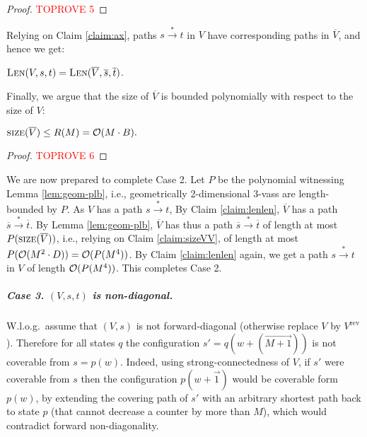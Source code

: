 \documentclass[a4paper, UKenglish, cleveref, autoref, thm-restate]{lipics-v2021}
\newcommand{\trans}[1]{\stackrel{#1}{\longrightarrow}}
\newcommand{\tran}{\trans{*}}
\newcommand{\size}{\textsc{size}}
\renewcommand{\vec}[1]{\overrightarrow{#1}}
\newcommand{\lb}{length-bounded\xspace}
\newcommand{\Len}[3]{\textsc{Len}(#1, #2, #3)}
\newcommand{\OO}{{\cal O}}
\newcommand{\vass}{{\sc vass}\xspace}
\newcommand{\tvass}{\parvass 3}
\newcommand{\geomvass}{geometrically 2-dimensional \tvass}
\newcommand{\parvass}[1]{{$#1$-\vass}\xspace}
\newcommand{\para}[1]{\vspace{-3mm}\subparagraph*{\bf #1.}}
\newcommand{\Wlog}{W.l.o.g.~}
\newcommand{\rev}[1]{{#1}^{\text{rev}}}
\newcommand{\essdvass}[1]{\overline{#1}}
\begin{document}
\begin{proof}\textcolor{red}{TOPROVE 5}\end{proof}
Relying on Claim \ref{claim:ax}, paths $s\tran t$ in $V$ have corresponding paths in $\essdvass V$,
and hence we get:
\begin{claim} \label{claim:lenlen}
$\Len V s t = \Len {\essdvass V} {\essdvass s} {\essdvass t}$.
\end{claim}
Finally, we argue that the size of $\essdvass V$ is bounded polynomially with respect to the size of $V$:
\begin{claim} \label{claim:sizeVV}
$\size(\essdvass V) \leq R(M) = \OO(M\cdot B).$
\end{claim}
\begin{proof}\textcolor{red}{TOPROVE 6}\end{proof}
We are now prepared to complete Case 2.
Let $P$ be the polynomial witnessing Lemma \ref{lem:geom-plb}, i.e.,
\geomvass are \lb by $P$.
As $V$ has a path $s\tran t$, 
By Claim \ref{claim:lenlen}, $\essdvass V$ has a path $\essdvass s \tran \essdvass t$.
By Lemma \ref{lem:geom-plb}, $\essdvass V$ has thus a path $\essdvass s \tran \essdvass t$
of length at most $P(\size(\essdvass V))$, i.e., relying on Claim \ref{claim:sizeVV},
of length at most $P(\OO(M^2\cdot D)) = \OO(P(M^{4}))$.
By Claim \ref{claim:lenlen} again, we get a path $s\tran t$ in $V$ of length
$\OO(P(M^{4}))$.
This completes Case 2.


\para{Case 3. $(V, s, t)$ is non-diagonal}

\Wlog assume that $(V, s)$ is not forward-diagonal (otherwise replace $V$ by $\rev V$).
Therefore for all states $q$ the configuration $s'=q(w+(\vec{M{+}1}))$ is not
coverable from $s=p(w)$. 
Indeed, using strong-connectedness of $V$, if $s'$ were coverable from $s$ then
the configuration $p(w + \vec 1)$ would be coverable form $p(w)$, by 
extending the covering path of $s'$ with an arbitrary shortest path back to state $p$ 
(that cannot decrease a counter by more than $M$), which would contradict forward non-diagonality.
\end{document}
